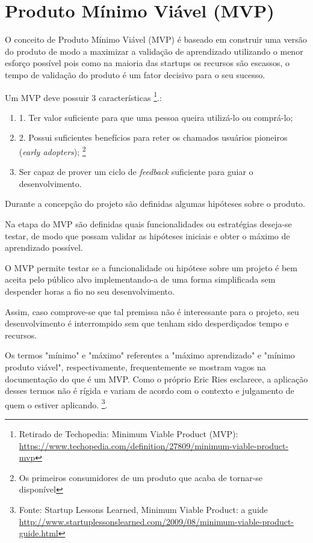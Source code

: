\section{Produto Mínimo Viável (MVP)}
	\par O conceito de Produto Mínimo Viável (MVP) é baseado em construir uma versão do produto de modo a maximizar a validação de aprendizado utilizando o menor esforço possível \cite{ries:11} pois como na maioria das startups os recursos são escassos, o tempo de validação do produto é um fator decisivo para o seu sucesso.
    \par Um MVP deve possuir 3 características \footnote{ Retirado de Techopedia: Minimum Viable Product (MVP): \url{https://www.techopedia.com/definition/27809/minimum-viable-product-mvp}}.:
    \begin{enumerate}
        \item 1. Ter valor suficiente para que uma pessoa queira utilizá-lo ou comprá-lo;
        \item 2. Possui suficientes benefícios para reter os chamados usuários pioneiros (\emph{early adopters}); \footnote{Os primeiros consumidores de um produto que acaba de tornar-se disponível}
        \item Ser capaz de prover um ciclo de \emph{feedback} suficiente para guiar o desenvolvimento.
\end{enumerate}
    \par Durante a concepção do projeto são definidas algumas hipóteses sobre o produto.
    \par Na etapa do MVP são definidas quais funcionalidades ou estratégias deseja-se testar, de modo que possam validar as hipóteses iniciais e obter o máximo de aprendizado possível.
    \par O MVP permite testar se a funcionalidade ou hipótese sobre um projeto é bem aceita pelo público alvo implementando-a de uma forma simplificada sem despender horas a fio no seu desenvolvimento.
    \par  Assim, caso comprove-se que tal premissa não é interessante para o projeto, seu desenvolvimento é interrompido sem que tenham sido desperdiçados tempo e recursos.
    \par Os termos "mínimo" e "máximo" referentes a "máximo aprendizado" e "mínimo produto viável", respectivamente, frequentemente se mostram vagos na documentação do que é um MVP. Como o próprio Eric Ries esclarece, a aplicação desses termos não é rígida e variam de acordo com o contexto e julgamento de quem o estiver aplicando. \footnote{Fonte: Startup Lessons Learned, Minimum Viable Product: a guide \url{http://www.startuplessonslearned.com/2009/08/minimum-viable-product-guide.html}}. 
